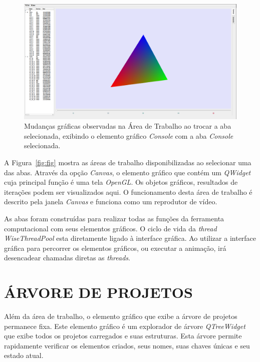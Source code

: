 \begin{figure}
	\centering
	\includegraphics[width=.9\linewidth]{Figures/IGU_001.png}
	\caption{Mudanças gráficas observadas na Área de Trabalho ao trocar a aba selecionada, exibindo o elemento gráfico \textit{Console} com a aba \textit{Console} selecionada.}
	\label{fig:sfig2}
\end{figure}

A Figura~\ref{fig:fig} mostra as áreas de trabalho disponibilizadas ao selecionar uma das abas. Através da opção \textit{Canvas}, o elemento gráfico que contém um \textit{QWidget} cuja principal função é uma tela \textit{OpenGL}. Os objetos gráficos, resultados de iterações podem ser visualizados aqui. O funcionamento desta área de trabalho é descrito pela janela \textit{Canvas} e funciona como um 
reprodutor de vídeo.

As abas foram construídas para realizar todas as funções da ferramenta computacional com seus elementos gráficos. O ciclo de vida da \textit{thread} \textit{WiseThreadPool} esta diretamente ligado à interface gráfica. Ao utilizar a interface gráfica para percorrer os elementos gráficos, ou executar a animação, irá desencadear chamadas diretas as \textit{threads}.

\section{ÁRVORE DE PROJETOS}\label{sec:arvore_projetos}

Além da área de trabalho, o elemento gráfico que exibe a árvore de projetos permanece fixa. Este elemento gráfico é um explorador de árvore \textit{QTreeWidget} que exibe todos os projetos carregados e suas estruturas. Esta árvore permite rapidamente verificar os elementos criados, seus nomes, suas chaves únicas e seu estado atual.


